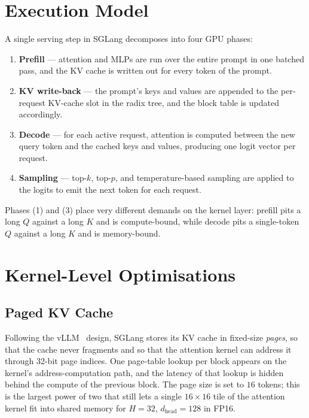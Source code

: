 \section{Execution Model}\label{sec:sglang_exec}
A single serving step in SGLang decomposes into four GPU phases:
\begin{enumerate}
    \item \textbf{Prefill} --- attention and MLPs are run over the
          entire prompt in one batched pass, and the KV cache is
          written out for every token of the prompt.
    \item \textbf{KV write-back} --- the prompt's keys and values
          are appended to the per-request KV-cache slot in the
          radix tree, and the block table is updated accordingly.
    \item \textbf{Decode} --- for each active request, attention
          is computed between the new query token and the cached
          keys and values, producing one logit vector per request.
    \item \textbf{Sampling} --- top-$k$, top-$p$, and
          temperature-based sampling are applied to the logits to
          emit the next token for each request.
\end{enumerate}
Phases (1) and (3) place very different demands on the kernel
layer: prefill pits a long $Q$ against a long $K$ and is
compute-bound, while decode pits a single-token $Q$ against a long
$K$ and is memory-bound.

\section{Kernel-Level Optimisations}\label{sec:sglang_kernels}

\subsection{Paged KV Cache}\label{sec:sglang_paged}
Following the vLLM~\cite{vllm} design, SGLang stores its KV cache
in fixed-size \emph{pages}, so that the cache never fragments and
so that the attention kernel can address it through 32-bit page
indices. One page-table lookup per block appears on the kernel's
address-computation path, and the latency of that lookup is
hidden behind the compute of the previous block. The page size is
set to $16$ tokens; this is the largest power of two that still
lets a single $16 \times 16$ tile of the attention kernel fit
into shared memory for $H = 32$, $d_{\text{head}} = 128$ in FP16.

